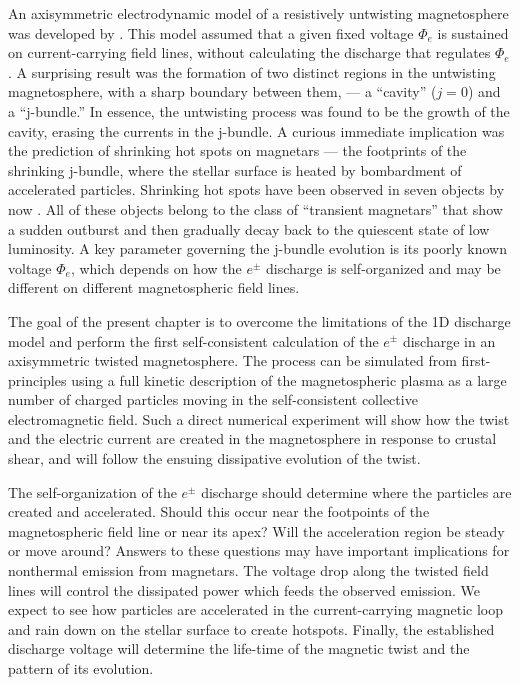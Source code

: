 An axisymmetric electrodynamic model of a resistively untwisting magnetosphere
was developed by
\citet[hereafter B09]{beloborodov_untwisting_2009}.
This model assumed
that a given fixed voltage $\Phi_e$ is sustained on current-carrying field lines,
without calculating the discharge that regulates $\Phi_e$.
A surprising result was
the formation of two distinct regions in the untwisting magnetosphere, with a
sharp boundary between them, --- a ``cavity'' ($j=0$) and a ``j-bundle.'' In
essence, the untwisting process was found to be the growth of the cavity,
erasing the currents in the j-bundle. A curious immediate implication was the
prediction of shrinking hot spots on magnetars --- the footprints of the
shrinking j-bundle, where the stellar surface is heated by bombardment of
  accelerated particles. Shrinking hot spots have been observed in seven
objects by now
\citetext{see data compilation in \citealp{beloborodov_magnetar_2016}}.
All of these objects
belong to the class of ``transient magnetars'' that show a sudden outburst and then
gradually decay back to the quiescent state of low luminosity.
A key parameter governing the j-bundle evolution is its poorly known voltage $\Phi_e$,
which depends on how the $e^\pm$ discharge is self-organized and
may be different on different magnetospheric field lines.

The goal of the present chapter is to overcome the limitations of the 1D discharge
model and perform the first self-consistent calculation of the $e^\pm$ discharge
in an axisymmetric twisted magnetosphere. The process can be simulated from
first-principles using a full kinetic description of the magnetospheric plasma
as a large number of charged particles moving in the self-consistent collective
electromagnetic field. Such a direct numerical experiment will show how the
twist and the electric current are created in the magnetosphere in response to
crustal shear, and will follow the ensuing dissipative evolution of the twist.

The self-organization of the $e^\pm$ discharge should determine where the
particles are created and accelerated. Should this occur near the footpoints of
the magnetospheric field line or near its apex? Will the acceleration region be
steady or move around? Answers to these questions may have important
implications for nonthermal emission from magnetars. The voltage drop along the
twisted field lines will control the dissipated power which feeds the observed
emission. We expect to see how particles are accelerated in the current-carrying
magnetic loop and rain down on the stellar surface to create hotspots. Finally,
the established discharge voltage will determine the life-time of the magnetic
twist and the pattern of its evolution.

